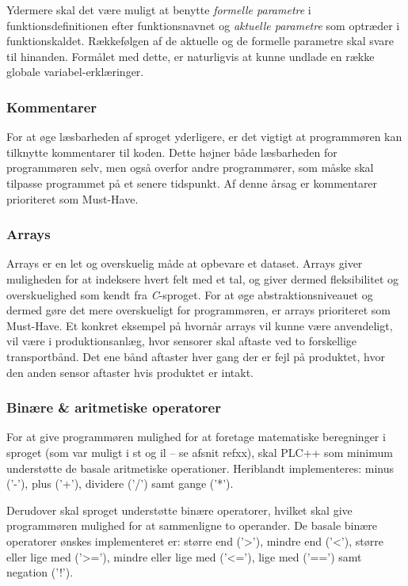 Ydermere skal det være muligt at benytte \textit{formelle parametre} i funktionsdefinitionen efter funktionsnavnet og \textit{aktuelle parametre} som optræder i funktionskaldet. Rækkefølgen af de aktuelle og de formelle parametre skal svare til hinanden. Formålet med dette, er naturligvis at kunne undlade en række globale variabel-erklæringer. 

\subsubsection{Kommentarer}
For at øge læsbarheden af sproget yderligere, er det vigtigt at programmøren kan tilknytte kommentarer til koden. Dette højner både læsbarheden for programmøren selv, men også overfor andre programmører, som måske skal tilpasse programmet på et senere tidspunkt. Af denne årsag er kommentarer prioriteret som Must-Have. 

\subsubsection{Arrays}
Arrays er en let og overskuelig måde at opbevare et dataset. Arrays giver muligheden for at indeksere hvert felt med et tal, og giver dermed fleksibilitet og overskuelighed som kendt fra \textit{C}-sproget. For at øge abstraktionsniveauet og dermed gøre det mere overskueligt for programmøren, er arrays prioriteret som Must-Have. Et konkret eksempel på hvornår arrays vil kunne være anvendeligt, vil være i produktionsanlæg, hvor sensorer skal aftaste ved to forskellige transportbånd. Det ene bånd aftaster hver gang der er fejl på produktet, hvor den anden sensor aftaster hvis produktet er intakt. 

\subsubsection{Binære \& aritmetiske operatorer} 
For at give programmøren mulighed for at foretage matematiske beregninger i sproget (som var muligt i \gls{st} og {il} – se afsnit refxx), skal PLC++ som minimum understøtte de basale aritmetiske operationer. Heriblandt implementeres: minus ('-'), plus ('+'), dividere ('/') samt gange ('*').

Derudover skal sproget understøtte binære operatorer, hvilket skal give programmøren mulighed for at sammenligne to operander. De basale binære operatorer ønskes implementeret er: større end ('>'), mindre end ('<'), større eller lige med ('>='), mindre eller lige med ('<='), lige med ('==') samt negation ('!').

